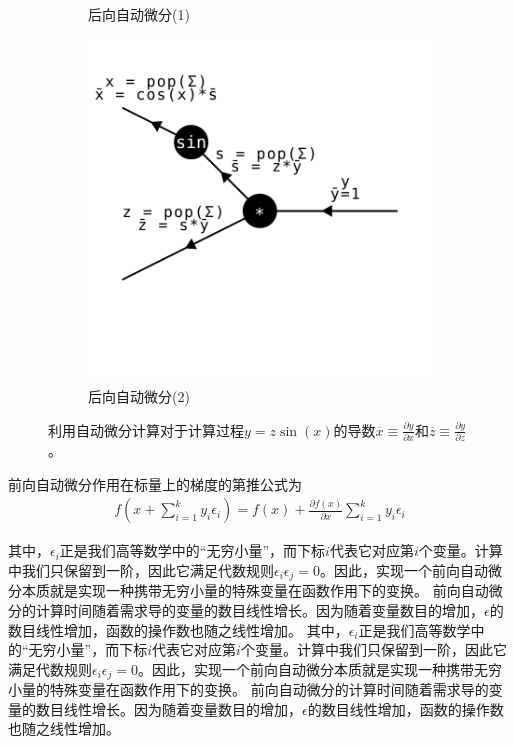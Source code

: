 \documentclass[A4,twoside,fontset=ubuntu,UTF8]{ctexart}
\begin{document}
\begin{figure}[t]
\begin{subfigure}[b]{0.32\textwidth}
    \caption{后向自动微分(1)}
\end{subfigure}
\begin{subfigure}[b]{0.32\textwidth}
    \centering
    \includegraphics[width=\textwidth, trim={0 0 1cm 0}, clip]{./backward-backward.pdf}
    \caption{后向自动微分(2)}
\end{subfigure}
        \caption{利用自动微分计算对于计算过程$y = z \sin(x)$的导数$\overline{x}\equiv \frac{\partial y}{\partial x}$和$\overline{z}\equiv \frac{\partial y}{\partial z}$。\label{fig:autodifftypes}} 
\end{figure}

前向自动微分作用在标量上的梯度的第推公式为
\begin{align}
    f(x+\sum\limits^k_{i=1} y_i \epsilon_i) = f(x) + \frac{\partial f(x)}{\partial x} \sum\limits^k_{i=1}y_i\epsilon_i
\end{align}

其中，$\epsilon_i$正是我们高等数学中的“无穷小量”，而下标$i$代表它对应第$i$个变量。计算中我们只保留到一阶，因此它满足代数规则$\epsilon_i\epsilon_j = 0$。因此，实现一个前向自动微分本质就是实现一种携带无穷小量的特殊变量在函数作用下的变换。
前向自动微分的计算时间随着需求导的变量的数目线性增长。因为随着变量数目的增加，$\epsilon$的数目线性增加，函数的操作数也随之线性增加。
其中，$\epsilon_i$正是我们高等数学中的“无穷小量”，而下标$i$代表它对应第$i$个变量。计算中我们只保留到一阶，因此它满足代数规则$\epsilon_i\epsilon_j = 0$。因此，实现一个前向自动微分本质就是实现一种携带无穷小量的特殊变量在函数作用下的变换。
前向自动微分的计算时间随着需求导的变量的数目线性增长。因为随着变量数目的增加，$\epsilon$的数目线性增加，函数的操作数也随之线性增加。
\end{document}
